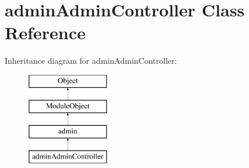 \hypertarget{classadminAdminController}{\section{admin\-Admin\-Controller Class Reference}
\label{classadminAdminController}
}
Inheritance diagram for admin\-Admin\-Controller\-:\begin{figure}[H]
\begin{center}
\leavevmode
\includegraphics[height=4.000000cm]{classadminAdminController}
\end{center}
\end{figure}
